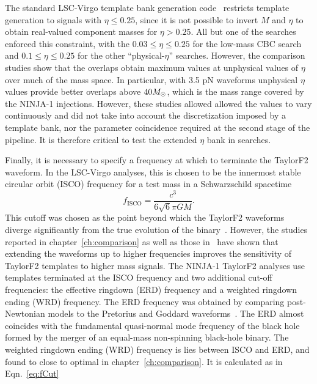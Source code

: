 The standard LSC-Virgo template bank generation
code~\cite{Babak:2006ty} restricts template generation to signals with
$\eta \le 0.25$, since it is not possible to invert $M$ and $\eta$ to
obtain real-valued component masses for $\eta > 0.25$.  All but one of
the searches enforced this constraint, with the $0.03 \le \eta \le
0.25$ for the low-mass CBC search and $0.1 \le \eta \le 0.25$ for the
other ``physical-$\eta$'' searches.  However, the comparison studies
show that the overlaps obtain maximum values at unphysical values of
$\eta$ over much of the mass space.  In particular, with 3.5 pN
waveforms unphysical $\eta$ values provide better overlaps above
$40 M_\odot$, which is the mass range covered by the NINJA-1 injections.
However, these studies allowed allowed the values to vary continuously
and did not take into account the discretization imposed by a template
bank, nor the parameter coincidence required at the second stage of
the pipeline.  It is therefore critical to test the extended $\eta$
bank in searches.

Finally, it is necessary to specify a frequency at which to terminate
the TaylorF2 waveform. In the LSC-Virgo analyses, this is chosen to be
the innermost stable circular orbit (ISCO) frequency for a test mass
in a Schwarzschild spacetime 
%
\begin{equation} \label{f_ISCO} f_\mathrm{ISCO} =
\frac{c^3}{6\sqrt{6}\pi GM}.  \end{equation}
%
This cutoff was chosen as the point beyond which the TaylorF2
waveforms diverge significantly from the true evolution of the
binary~\cite{Blanchet:2002av}.  However, the studies reported in
chapter~\ref{ch:comparison} as well as those in~\cite{Pan:2007nw} have
shown that extending the waveforms up to higher frequencies improves
the sensitivity of TaylorF2 templates to higher mass signals.  The
NINJA-1 TaylorF2 analyses use templates terminated at the ISCO
frequency and two additional cut-off frequencies: the effective
ringdown (ERD) frequency and a weighted ringdown ending (WRD)
frequency. The ERD frequency was obtained by comparing post-Newtonian
models to the Pretorius and Goddard waveforms~\cite{Pan:2007nw}. The
ERD almost coincides with the fundamental quasi-normal mode frequency
of the black hole formed by the merger of an equal-mass non-spinning
black-hole binary. The weighted ringdown ending (WRD) frequency is
lies between ISCO and ERD, and found to close to optimal in
chapter~\ref{ch:comparison}.  It is calculated as in
Eqn.~\ref{eq:fCut}


